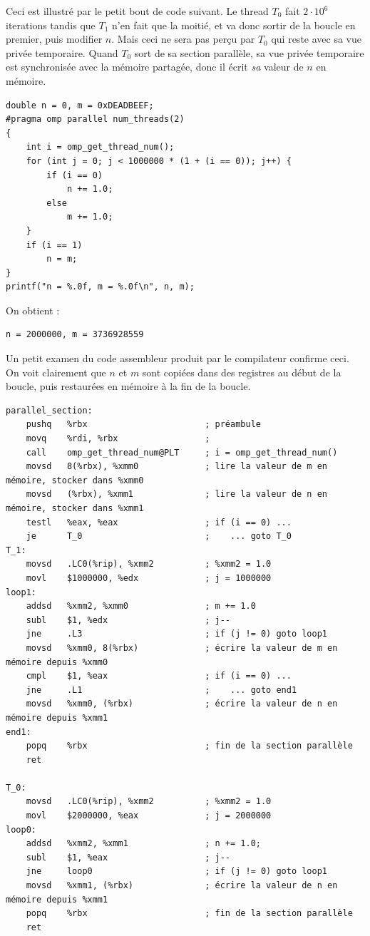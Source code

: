 Ceci est illustré par le petit bout de code suivant. Le thread $T_0$ fait
$2 \cdot 10^6$ iterations tandis que $T_1$ n'en fait que la moitié, et va donc
sortir de la boucle en premier, puis modifier $n$. Mais ceci ne sera pas perçu
par $T_0$ qui reste avec sa \og vue privée temporaire\fg. Quand $T_0$ sort de sa
section parallèle, sa vue privée temporaire est synchronisée avec la mémoire
partagée, donc il écrit \emph{sa} valeur de $n$ en mémoire.

\begin{myfilet}
\begin{verbatim}
double n = 0, m = 0xDEADBEEF;
#pragma omp parallel num_threads(2)
{
	int i = omp_get_thread_num();
	for (int j = 0; j < 1000000 * (1 + (i == 0)); j++) {
		if (i == 0)
			n += 1.0;
		else
			m += 1.0;
	}
	if (i == 1)
		n = m;
}
printf("n = %.0f, m = %.0f\n", n, m);
\end{verbatim}
\end{myfilet}

On obtient :
\begin{verbatim}
n = 2000000, m = 3736928559
\end{verbatim}

\begin{danger}
  Un petit examen du code assembleur produit par le compilateur confirme
  ceci. On voit clairement que $n$ et $m$ sont copiées dans des registres au
  début de la boucle, puis restaurées en mémoire à la fin de la boucle.
\begin{myfilet}
\begin{verbatim}
parallel_section:
	pushq   %rbx                       ; préambule
	movq    %rdi, %rbx                 ;
	call    omp_get_thread_num@PLT     ; i = omp_get_thread_num()
	movsd   8(%rbx), %xmm0             ; lire la valeur de m en mémoire, stocker dans %xmm0
	movsd   (%rbx), %xmm1              ; lire la valeur de n en mémoire, stocker dans %xmm1
	testl   %eax, %eax                 ; if (i == 0) ...
	je      T_0                        ;    ... goto T_0
T_1:
	movsd   .LC0(%rip), %xmm2          ; %xmm2 = 1.0
	movl    $1000000, %edx             ; j = 1000000
loop1:
	addsd   %xmm2, %xmm0               ; m += 1.0
	subl    $1, %edx                   ; j--
	jne     .L3                        ; if (j != 0) goto loop1
	movsd   %xmm0, 8(%rbx)             ; écrire la valeur de m en mémoire depuis %xmm0
	cmpl    $1, %eax                   ; if (i == 0) ...
	jne     .L1                        ;    ... goto end1
	movsd   %xmm0, (%rbx)              ; écrire la valeur de n en mémoire depuis %xmm1
end1:
	popq    %rbx                       ; fin de la section parallèle
	ret

T_0:
	movsd   .LC0(%rip), %xmm2          ; %xmm2 = 1.0
	movl    $2000000, %eax             ; j = 2000000
loop0:
	addsd   %xmm2, %xmm1               ; n += 1.0;
	subl    $1, %eax                   ; j--
	jne     loop0                      ; if (j != 0) goto loop1
	movsd   %xmm1, (%rbx)              ; écrire la valeur de n en mémoire depuis %xmm1
	popq    %rbx                       ; fin de la section parallèle
	ret
\end{verbatim}
\end{myfilet}
\end{danger}%

